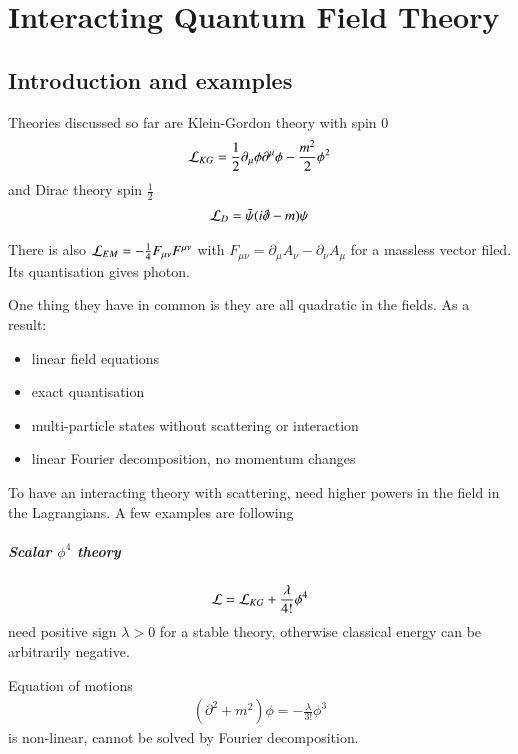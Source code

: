 \chapter{Interacting Quantum Field Theory}
\setcounter{chapter}{4}
\section{Introduction and examples}
Theories discussed so far are Klein-Gordon theory with spin $0$ 
\begin{align}\mathcal{L}_{KG} = \frac{1}{2}\partial_\mu\phi\partial^\mu\phi - \frac{m^2}{2}\phi^2\end{align}
and Dirac theory spin $\frac{1}{2}$ 
\begin{align}\mathcal{L}_D = \bar{\psi}(i\slashed{\partial} - m) \psi \end{align}

There is also $\mathcal{L}_{EM} = -\frac{1}{4}F_{\mu\nu}F^{\mu\nu}$ with $F_{\mu\nu} = \partial_\mu A_\nu - \partial_\nu A_\mu$ for a massless vector filed. Its quantisation gives photon.

One thing they have in common is they are all quadratic in the fields. As a result:
\begin{itemize}
	\item linear field equations
	\item exact quantisation
	\item multi-particle states without scattering or interaction
	\item linear Fourier decomposition, no momentum changes
\end{itemize}

To have an interacting theory with scattering, need higher powers in the field in the Lagrangians. A few examples are following
\paragraph{Scalar $\phi^4$ theory}
\begin{align*}
	\mathcal{L} = \mathcal{L}_{KG} + \frac{\lambda}{4!} \phi^4
\end{align*}
need positive sign $\lambda > 0$ for a stable theory, otherwise classical energy can be arbitrarily negative.

Equation of motions
\begin{align*}
	(\partial^2+ m ^2) \phi = -\frac{\lambda}{3!} \phi^3
\end{align*}
is non-linear, cannot be solved by Fourier decomposition.

